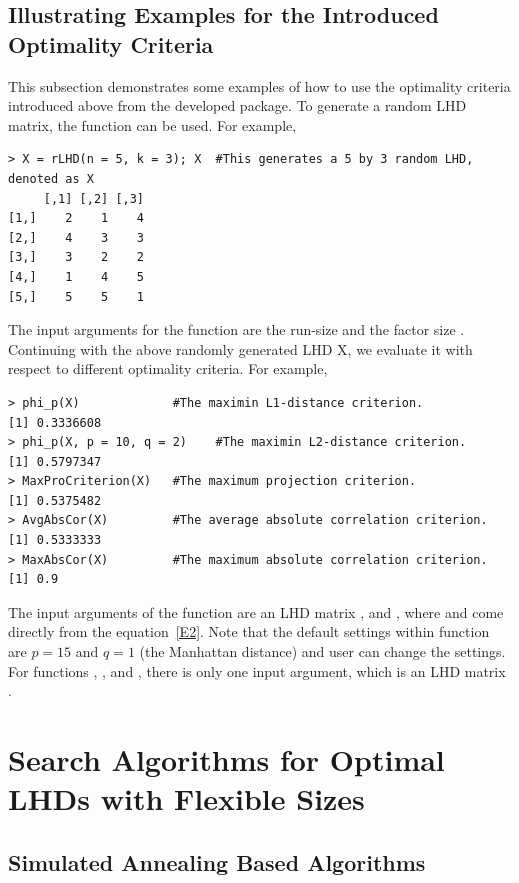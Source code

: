 \subsection{Illustrating Examples for the Introduced Optimality Criteria}

This subsection demonstrates some examples of how to use the optimality criteria introduced above from the developed  package. To generate a random LHD matrix, the function  can be used. For example,
\begin{verbatim}
> X = rLHD(n = 5, k = 3); X  #This generates a 5 by 3 random LHD, denoted as X
     [,1] [,2] [,3]
[1,]    2    1    4
[2,]    4    3    3
[3,]    3    2    2
[4,]    1    4    5
[5,]    5    5    1
\end{verbatim}
The input arguments for the function  are the run-size  and the factor size . Continuing with the above randomly generated LHD X, we evaluate it with respect to different optimality criteria. For example,
\begin{verbatim}
> phi_p(X)             #The maximin L1-distance criterion.
[1] 0.3336608
> phi_p(X, p = 10, q = 2)    #The maximin L2-distance criterion.
[1] 0.5797347
> MaxProCriterion(X)   #The maximum projection criterion.
[1] 0.5375482
> AvgAbsCor(X)         #The average absolute correlation criterion.
[1] 0.5333333
> MaxAbsCor(X)         #The maximum absolute correlation criterion.
[1] 0.9
\end{verbatim}
The input arguments of the function  are an LHD matrix ,  and , where  and  come directly from the equation~\ref{E2}. Note that the default settings within function  are $p=15$ and $q=1$ (the Manhattan distance) and user can change the settings. For functions , , and , there is only one input argument, which is an LHD matrix .

\section{Search Algorithms for Optimal LHDs with Flexible Sizes}\label{Algs}

\subsection{Simulated Annealing Based Algorithms}

